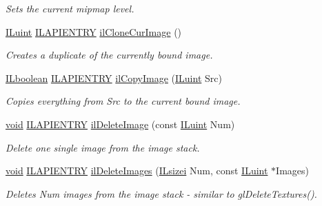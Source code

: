 \begin{DoxyCompactItemize}
\begin{DoxyCompactList}\small\item\em Sets the current mipmap level. \end{DoxyCompactList}\item 
\hyperlink{group__il__types_gaff8e86a1072c8d7cfe387fb87c6ed8e1}{I\+Luint} \hyperlink{_i_l_8h_a69c08a8d06df986f7e46f209d131ef2f}{I\+L\+A\+P\+I\+E\+N\+T\+R\+Y} \hyperlink{group__image__mgt_gae0771d03e54685b692b1103a1b29f80c}{il\+Clone\+Cur\+Image} ()
\begin{DoxyCompactList}\small\item\em Creates a duplicate of the currently bound image. \end{DoxyCompactList}\item 
\hyperlink{group__il__types_gaa6aa7c95cfdc06b4d8601ef832b7bb0a}{I\+Lboolean} \hyperlink{_i_l_8h_a69c08a8d06df986f7e46f209d131ef2f}{I\+L\+A\+P\+I\+E\+N\+T\+R\+Y} \hyperlink{group__image__mgt_gaf0f3ef5b949468a12a4b49e0fb2cb3cb}{il\+Copy\+Image} (\hyperlink{group__il__types_gaff8e86a1072c8d7cfe387fb87c6ed8e1}{I\+Luint} Src)
\begin{DoxyCompactList}\small\item\em Copies everything from Src to the current bound image. \end{DoxyCompactList}\item 
\hyperlink{_i_l_8h_a5530e04d947bcddd83639ea7940faf10}{void} \hyperlink{_i_l_8h_a69c08a8d06df986f7e46f209d131ef2f}{I\+L\+A\+P\+I\+E\+N\+T\+R\+Y} \hyperlink{group__image__mgt_ga74c70352949963d2b30c919662a65844}{il\+Delete\+Image} (const \hyperlink{group__il__types_gaff8e86a1072c8d7cfe387fb87c6ed8e1}{I\+Luint} Num)
\begin{DoxyCompactList}\small\item\em Delete one single image from the image stack. \end{DoxyCompactList}\item 
\hyperlink{_i_l_8h_a5530e04d947bcddd83639ea7940faf10}{void} \hyperlink{_i_l_8h_a69c08a8d06df986f7e46f209d131ef2f}{I\+L\+A\+P\+I\+E\+N\+T\+R\+Y} \hyperlink{group__image__mgt_gab4346d371243537a7050e255f99c8b16}{il\+Delete\+Images} (\hyperlink{group__il__types_gad51812c5d3fd67d85973dd7a7cb80d8e}{I\+Lsizei} Num, const \hyperlink{group__il__types_gaff8e86a1072c8d7cfe387fb87c6ed8e1}{I\+Luint} $\ast$Images)
\begin{DoxyCompactList}\small\item\em Deletes Num images from the image stack -\/ similar to gl\+Delete\+Textures(). \end{DoxyCompactList}\item 

\end{DoxyCompactItemize}
